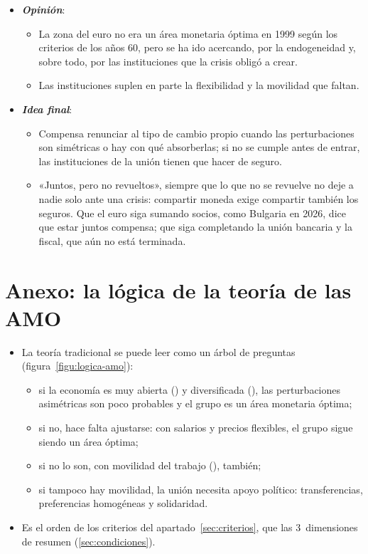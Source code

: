 \documentclass[11pt]{article}
\begin{document}
\begin{itemize}
\item \textbf{\emph{Opinión}}:
  \begin{itemize}
  \item La zona del euro no era un área monetaria óptima en 1999 según los criterios de los años 60, pero se ha ido acercando, por la endogeneidad y, sobre todo, por las instituciones que la crisis obligó a crear.
  \item Las instituciones suplen en parte la flexibilidad y la movilidad que faltan.
  \end{itemize}
\item \textbf{\emph{Idea final}}:
  \begin{itemize}
  \item Compensa renunciar al tipo de cambio propio cuando las perturbaciones son simétricas o hay con qué absorberlas; si no se cumple antes de entrar, las instituciones de la unión tienen que hacer de seguro.
  \item «Juntos, pero no revueltos», siempre que lo que no se revuelve no deje a nadie solo ante una crisis: compartir moneda exige compartir también los seguros. Que el euro siga sumando socios, como Bulgaria en 2026\nocite{BCE2026Bulgaria}, dice que estar juntos compensa; que siga completando la unión bancaria y la fiscal, que aún no está terminada.
  \end{itemize}
\end{itemize}

\clearpage
\appendix

\section{Anexo: la lógica de la teoría de las AMO}\label{anexo:logica-amo}

\begin{itemize}
\item La teoría tradicional se puede leer como un árbol de preguntas (figura~\ref{figu:logica-amo}):
  \begin{itemize}
  \item si la economía es muy abierta () y diversificada (), las perturbaciones asimétricas son poco probables y el grupo es un área monetaria óptima;
  \item si no, hace falta ajustarse: con salarios y precios flexibles, el grupo sigue siendo un área óptima;
  \item si no lo son, con movilidad del trabajo (), también;
  \item si tampoco hay movilidad, la unión necesita apoyo político: transferencias, preferencias homogéneas y solidaridad.
  \end{itemize}
\item Es el orden de los criterios del apartado~\ref{sec:criterios}, que las 3~dimensiones de  resumen (\ref{sec:condiciones}).
\end{itemize}
\end{document}
